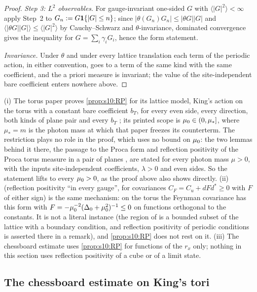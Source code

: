 \begin{proof}
\emph{Step 3: $L^2$ observables.} For gauge-invariant one-sided $G$ with $\langle|G|^2\rangle<\infty$ apply Step~2 to $G_n:= G\mathbf 1\{|G|\le n\}$; since $|\theta(G_n)G_n|\le|\theta G||G|$ and $\langle|\theta G||G|\rangle\le\langle|G|^2\rangle$ by Cauchy--Schwarz and $\theta$-invariance, dominated convergence gives the inequality for $G=\sum_i\gamma_iG_i$, hence the form statement.

\emph{Invariance.} Under $\theta$ and under every lattice translation each term of the periodic action, in either convention, goes to a term of the same kind with the same coefficient, and the a priori measure is invariant; the value of the site-independent bare coefficient enters nowhere above.
\end{proof}

\begin{remark}
(i) The torus paper \cite{SymPhase} proves \cref{prop:s10:RP} for its lattice model, King's action on the torus with a constant bare coefficient $b_T$, for every even side, every direction, both kinds of plane pair and every $b_T$ \cite[prop:C-RP(a)]{SymPhase}; its printed scope is $\mu_0\in(0,\mu_*]$, where $\mu_*=m$ is the photon mass at which that paper freezes its counterterm. The restriction plays no role in the proof, which uses no bound on $\mu_0$: the two lemmas behind it there, the passage to the Proca form \cite[lem:C-FP]{SymPhase} and reflection positivity of the Proca torus measure in a pair of planes \cite[lem:C-RPP(ii)]{SymPhase}, are stated for every photon mass $\mu>0$, with the inputs site-independent coefficients, $\lambda>0$ and even sides. So the statement lifts to every $\mu_0>0$, as the proof above also shows directly. (ii) \cite[Cor.~5.4]{BFS1} (reflection positivity ``in every gauge'', for covariances $C_F=C_u+dFd^*\ge0$ with $F$ of either sign) is the same mechanism: on the torus the Feynman covariance has this form with $F=-\mu_0^{-2}(\Delta_0+\mu_0^2)^{-1}\le0$ on functions orthogonal to the constants. It is not a literal instance (the region of \cite[\S5]{BFS1} is a bounded subset of the lattice with a boundary condition, and reflection positivity of periodic conditions is asserted there in a remark), and \cref{prop:s10:RP} does not rest on it. (iii) The chessboard estimate uses \cref{prop:s10:RP} for functions of the $r_x$ only; nothing in this section uses reflection positivity of a cube or of a limit state.
\end{remark}

\subsection{The chessboard estimate on King's tori}

